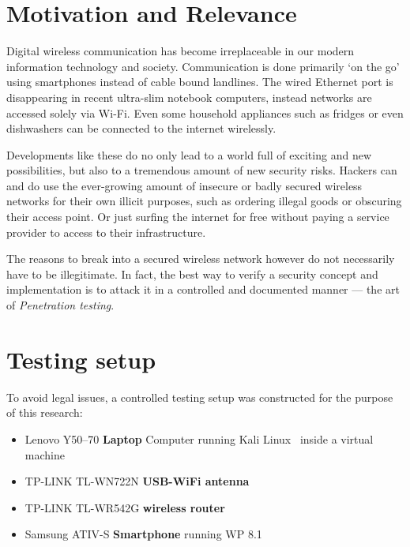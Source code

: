 \section{Motivation and Relevance}

Digital wireless communication has become irreplaceable in our modern information technology and society. Communication is done primarily `on the go' using smartphones instead of cable bound landlines. The wired Ethernet port is disappearing in recent ultra-slim notebook computers, instead networks are accessed solely via Wi-Fi. Even some household appliances such as fridges or even dishwashers can be connected to the internet wirelessly.

Developments like these do no only lead to a world full of exciting and new possibilities, but also to a tremendous amount of new security risks. Hackers can and do use the ever-growing amount of insecure or badly secured wireless networks for their own illicit purposes, such as ordering illegal goods or obscuring their access point. Or just surfing the internet for free without paying a service provider to access to their infrastructure.  

The reasons to break into a secured wireless network however do not necessarily have to be illegitimate. In fact, the best way to verify a security concept and implementation is to attack it in a controlled and documented manner --- the art of \emph{Penetration testing}.

\section{Testing setup}

To avoid legal issues, a controlled testing setup was constructed for the purpose of this research:

\begin{itemize}

\item{Lenovo Y50--70 \textbf{Laptop} Computer running Kali Linux~\cite{OffSec17} inside a virtual machine}

\item{TP-LINK TL-WN722N \textbf{USB-WiFi antenna}}

\item{TP-LINK TL-WR542G \textbf{wireless router}}

\item{Samsung ATIV-S \textbf{Smartphone} running WP 8.1}

\end{itemize}

